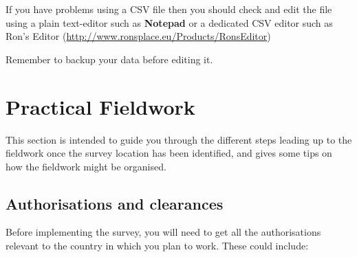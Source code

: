 \documentclass[12pt,a4paper]{book}
\begin{document}
If you have problems using a CSV file then you should check and edit the file using a plain text-editor such as \textbf{Notepad} or a dedicated CSV editor such as Ron's Editor (\url{http://www.ronsplace.eu/Products/RonsEditor})

Remember to backup your data before editing it.

\hypertarget{practical}{%
\chapter{Practical Fieldwork}\label{practical}}

This section is intended to guide you through the different steps leading up to the fieldwork once the survey location has been identified, and gives some tips on how the fieldwork might be organised.

\hypertarget{authorisations-and-clearances}{%
\section{Authorisations and clearances}\label{authorisations-and-clearances}}

Before implementing the survey, you will need to get all the authorisations relevant to the country in which you plan to work. These could include:
\end{document}
